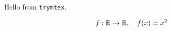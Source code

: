 \documentclass{article}
\begin{document}
Hello from \texttt{trymtex}.

\[
  f : \mathbb{R} \to \mathbb{R}, \quad f(x) = x^2
\]
\end{document}
